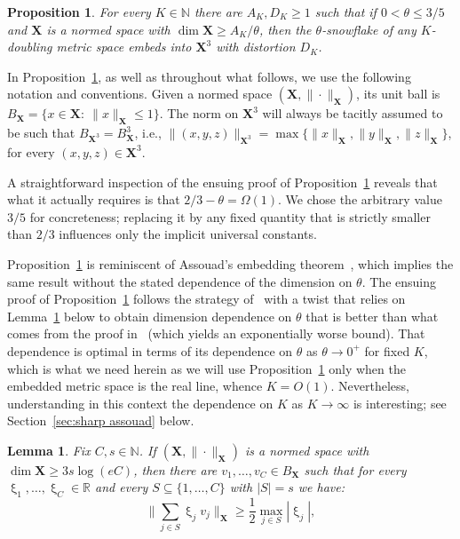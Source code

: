 \documentclass[11pt,reqno]{amsart}
\newtheorem{lemma}[theorem]{Lemma}
\newtheorem{prop}[theorem]{Proposition}
\newcommand{\R}{\mathbb{R}}
\newcommand{\N}{\mathbb{N}}
\renewcommand{\le}{\leqslant}
\renewcommand{\ge}{\geqslant}
\renewcommand{\subset}{\subseteq}
\newcommand{\X}{\mathbf X}
\newcommand{\1}{\mathbf{1}}
\begin{document}
\begin{prop}\label{prop:Xcubed} For every $K\in \N$ there are $A_K,D_K\ge 1$ such that if $0<\theta\le 3/5$ and $\X$ is a normed space with $\dim \X\ge A_K/\theta$, then the $\theta$-snowflake of any $K$-doubling metric space embeds into $\X^3$ with distortion $D_K$. 
\end{prop}




In Proposition~\ref{prop:Xcubed}, as well as throughout what follows,  we use the following notation and conventions. Given a normed space  $(\X,\|\cdot\|_\X)$, its unit ball is $B_\X=\{x\in \X:\ \|x\|_\X\le 1\}$. The norm on $\X^3$ will always be tacitly assumed  to be  such that $B_{\X^3}=B_\X^3$, i.e.,  $\|(x,y,z)\|_{\X^3}=\max\{\|x\|_\X,\|y\|_\X,\|z\|_\X\}$, for every $(x,y,z)\in \X^3$.  

A straightforward inspection of the ensuing proof of Proposition~\ref{prop:Xcubed}   reveals that what it actually requires is that $2/3-\theta=\Omega(1)$. We chose the arbitrary value $3/5$ for concreteness; replacing it by any fixed  quantity that is strictly smaller than $2/3$ influences only the implicit universal constants.  

Proposition~\ref{prop:Xcubed} is reminiscent of Assouad's embedding theorem~\cite{Assouad}, which implies the same result without the stated dependence of the dimension on $\theta$. The ensuing proof of Proposition~\ref{prop:Xcubed} follows the strategy of~\cite{Assouad} with a twist that relies on Lemma~\ref{lem:one sided JL in any norm} below to obtain dimension dependence on $\theta$ that is  better than what comes from the proof in~\cite{Assouad} (which yields an exponentially worse bound). That dependence is optimal in terms of its dependence on $\theta$ as $\theta\to 0^+$ for fixed $K$, which is what we need herein as we will use Proposition~\ref{prop:Xcubed} only when the embedded metric space is the real line, whence $K=O(1)$. Nevertheless, understanding in this context the dependence on $K$ as $K\to \infty$ is interesting; see Section~\ref{sec:sharp assouad} below. 


\begin{lemma}\label{lem:one sided JL in any norm} Fix $C,s\in \N$. If $(\X,\|\cdot\|_\X)$ is a normed space with $\dim \X\ge 3s\log (eC)$, then there are  $v_1,\ldots,v_C\in B_\X$ such that for every $\upxi_1,\ldots,\upxi_C\in \R$ and every $S\subset \{1,\ldots,C\}$ with $|S|=s$ we have:
\begin{equation}\label{eq:1/2 all subsets}
  \Big\|\sum_{j\in S} \upxi_j v_j\Big\|_\X\ge \frac12\max_{j\in S}|\upxi_j|, 
\end{equation}
\end{lemma}
\end{document}
